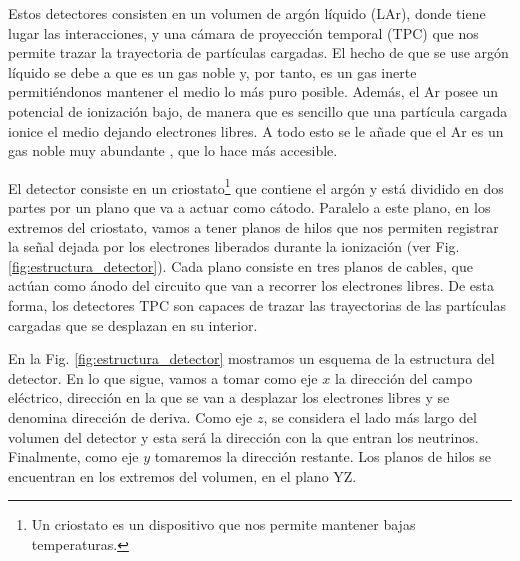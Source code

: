 \documentclass[a4paper,12pt,oneside,titlepage]{book}
\begin{document}
Estos detectores consisten en un volumen de argón líquido (LAr), donde tiene lugar las interacciones, y una cámara de proyección temporal (TPC) que nos permite trazar la trayectoria de partículas cargadas. El hecho de que se use argón líquido se debe a que es un gas noble y, por tanto, es un gas inerte permitiéndonos mantener el medio lo más puro posible. Además, el Ar posee un potencial de ionización bajo, de manera que es sencillo que una partícula cargada ionice el medio dejando electrones libres. A todo esto se le añade que el Ar es un gas noble muy abundante \cite{lar_review}, que lo hace más accesible. 

El detector consiste en un criostato\footnote{Un criostato es un  dispositivo que nos permite mantener bajas temperaturas.} que contiene el argón y está dividido en dos partes por un plano que va a actuar como cátodo. Paralelo a este plano, en los extremos del criostato, vamos a tener planos de hilos que nos permiten registrar la señal dejada por los electrones liberados durante la ionización (ver Fig. \ref{fig:estructura_detector}). Cada plano consiste en tres planos de cables, que actúan como ánodo del circuito que van a recorrer los electrones libres. De esta forma, los detectores TPC son capaces de trazar las trayectorias de las partículas cargadas que se desplazan en su interior.

En la Fig. \ref{fig:estructura_detector} mostramos un esquema de la estructura del detector. En lo que sigue, vamos a tomar como eje $x$ la dirección del campo eléctrico, dirección en la que se van a desplazar los electrones libres y se denomina dirección de deriva. Como eje $z$, se considera el lado más largo del volumen del detector y esta será la dirección con la que entran los neutrinos. Finalmente, como eje $y$ tomaremos la dirección restante. Los planos de hilos se encuentran en los extremos del volumen, en el plano YZ.
\end{document}
